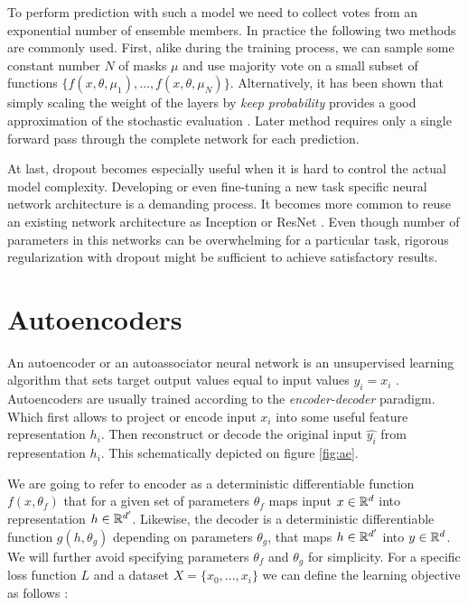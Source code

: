 To perform prediction with such a model we need to collect votes from an exponential number of ensemble members.
In practice the following two methods are commonly used. First, alike during the training process, we can sample some constant number $N$ of masks $\mu$ and use majority vote on a small subset of functions $\{f(x, \theta, \mu_1), \ldots, f(x, \theta, \mu_N)\}$. Alternatively, it has been shown that simply scaling the weight of the layers by \textit{keep probability} provides a good approximation of the stochastic evaluation \cite{Srivastava2014}. Later method requires only a single forward pass through the complete network for each prediction.

At last, dropout becomes especially useful when it is hard to control the actual model complexity. Developing or even fine-tuning a new task specific neural network architecture is a demanding process. It becomes more common to reuse an existing network architecture as Inception or ResNet \cite{He2015, Szegedy2016}. Even though number of parameters in this networks can be overwhelming for a particular task, rigorous regularization with dropout might be sufficient to achieve satisfactory results.


\section{Autoencoders}\label{ch:ae}
An autoencoder or an autoassociator neural network is an unsupervised learning algorithm that sets target output values equal to input values $y_i=x_i$ \cite{Ng2011,RanzatoMarcAurelio2007}.
Autoencoders are usually trained according to the \textit{encoder-decoder} paradigm.
Which first allows to project or encode input $x_i$ into some useful feature representation $h_i$.
Then reconstruct or decode the original input $\hat{y_i}$ from representation $h_i$.
This schematically depicted on figure \ref{fig:ae}.





We are going to refer to encoder as a deterministic differentiable function $f(x, \theta_f)$ that for a given set of parameters $\theta_f$ maps input $x\in \Bbb{R}^d$ into representation $h \in \Bbb{R}^{d'}$.
Likewise, the decoder is a deterministic differentiable function $g(h, \theta_g)$ depending on parameters $\theta_g$, that maps $h\in\Bbb{R}^{d'}$ into $y\in \Bbb{R}^d$. We will further avoid specifying parameters $\theta_f$ and $\theta_g$ for simplicity.
For a specific loss function $L$ and a dataset $X=\{x_0, ..., x_i\}$ we can define the learning objective as follows \cite{Good2016}:

